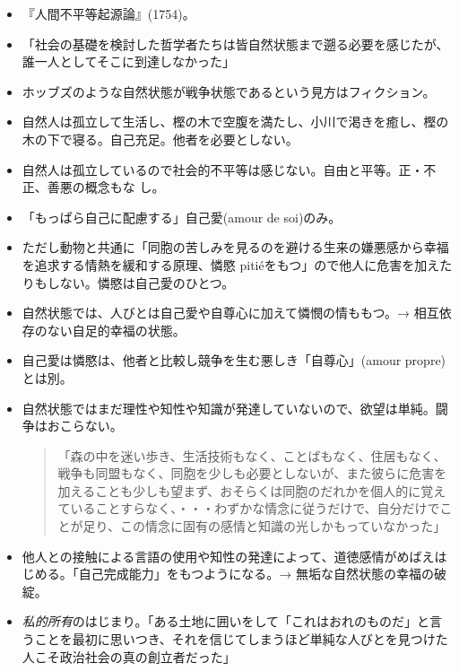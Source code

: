 \documentclass[uplatex,dvipdfmx]{jsarticle} \usepackage{mystyle}%
\begin{document}
  \begin{itemize}

\item 『人間不平等起源論』(1754)。

\item 「社会の基礎を検討した哲学者たちは皆自然状態まで遡る必要を感じたが、誰一人としてそこに到達しなかった」

\item ホッブズのような自然状態が戦争状態であるという見方はフィクション。

\item 自然人は孤立して生活し、樫の木で空腹を満たし、小川で渇きを癒し、樫の木の下で寝る。自己充足。他者を必要としない。

\item 自然人は孤立しているので社会的不平等は感じない。自由と平等。正・不正、善悪の概念もな
  し。
\item 「もっぱら自己に配慮する」自己愛(amour de soi)のみ。

\item ただし動物と共通に「同胞の苦しみを見るのを避ける生来の嫌悪感から幸福を追求する情熱を緩和する原理、憐愍 piti\'{e}をもつ」ので他人に危害を加えたりもしない。憐愍は自己愛のひとつ。

\item 自然状態では、人びとは自己愛や自尊心に加えて憐憫の情ももつ。→ 相互依存のない自足的幸福の状態。

 \item 自己愛は憐愍は、他者と比較し競争を生む悪しき「自尊心」(amour propre)とは別。

\item 自然状態ではまだ理性や知性や知識が発達していないので、欲望は単純。闘争はおこらない。

\begin{quote}
  「森の中を迷い歩き、生活技術もなく、ことばもなく、住居もなく、戦争も同盟もなく、同胞を少しも必要としないが、また彼らに危害を加えることも少しも望まず、おそらくは同胞のだれかを個人的に覚えていることすらなく、・・・わずかな情念に従うだけで、自分だけでことが足り、この情念に固有の感情と知識の光しかもっていなかった」
\end{quote}

\item 他人との接触による言語の使用や知性の発達によって、道徳感情がめばえはじめる。「自己完成能力」をもつようになる。→ 無垢な自然状態の幸福の破綻。


\item \emph{私的所有}のはじまり。「ある土地に囲いをして「これはおれのものだ」と言うことを最初に思いつき、それを信じてしまうほど単純な人びとを見つけた人こそ政治社会の真の創立者だった」


\end{itemize}
\end{document}
